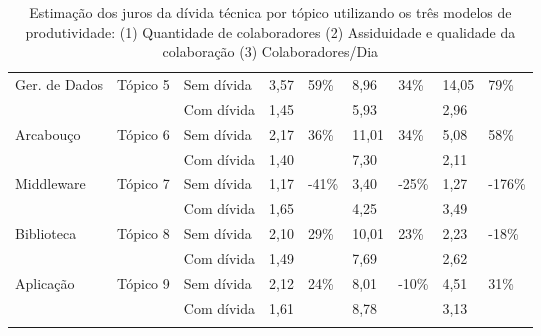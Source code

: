 \begin{longtable}{|l|l|l|l|l|l|l|l|l|}
\multirow{2}{*}{Ger. de Dados} & \multirow{2}{*}{Tópico 5}  & Sem dívida              & 3,57            & \multirow{2}{*}{59\%}   & 8,96            & \multirow{2}{*}{34\%}    & 14,05           & \multirow{2}{*}{79\%}   \\ \cline{3-4} \cline{6-6} \cline{8-8}
                               &                            & Com dívida           & 1,45            &                         & 5,93            &                          & 2,96            &                         \\ \hline
\multirow{2}{*}{Arcabouço}                      & \multirow{2}{*}{Tópico 6}  & Sem dívida              & 2,17            & \multirow{2}{*}{36\%}   & 11,01           & \multirow{2}{*}{34\%}    & 5,08            & \multirow{2}{*}{58\%}  \\ \cline{3-4} \cline{6-6} \cline{8-8}
                      &                            & Com dívida           & 1,40            &                         & 7,30            &                          & 2,11            &                         \\ \hline
\multirow{2}{*}{Middleware}                     & \multirow{2}{*}{Tópico 7}  & Sem dívida              & 1,17            & \multirow{2}{*}{-41\%}  & 3,40            & \multirow{2}{*}{-25\%}   & 1,27            & \multirow{2}{*}{-176\%} \\ \cline{3-4} \cline{6-6} \cline{8-8}
                     &                            & Com dívida           & 1,65            &                         & 4,25            &                          & 3,49            &                         \\ \hline
\multirow{2}{*}{Biblioteca}                     & \multirow{2}{*}{Tópico 8}  & Sem dívida              & 2,10            & \multirow{2}{*}{29\%}   & 10,01           & \multirow{2}{*}{23\%}    & 2,23            & \multirow{2}{*}{-18\%}  \\ \cline{3-4} \cline{6-6} \cline{8-8}
                     &                            & Com dívida           & 1,49            &                         & 7,69            &                          & 2,62            &                         \\ \hline
\multirow{2}{*}{Aplicação}                       & \multirow{2}{*}{Tópico 9}  & Sem dívida              & 2,12            & \multirow{2}{*}{24\%}   & 8,01            & \multirow{2}{*}{-10\%}   & 4,51            & \multirow{2}{*}{31\%}  \\ \cline{3-4} \cline{6-6} \cline{8-8}
                      &                            & Com dívida           & 1,61            &                         & 8,78            &                          & 3,13            &                         \\ \hline
\caption{Estimação dos juros da dívida técnica por tópico utilizando os três modelos de produtividade: (1) Quantidade de colaboradores (2) Assiduidade e qualidade da colaboração (3) Colaboradores/Dia}
\label{tab:estimacao_juros_topico_analise}
\end{longtable}

